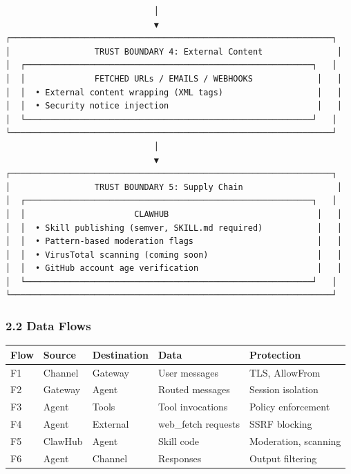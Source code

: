 \begin{lstlisting}
                              │
                              ▼
┌─────────────────────────────────────────────────────────────────┐
│                 TRUST BOUNDARY 4: External Content               │
│  ┌──────────────────────────────────────────────────────────┐   │
│  │              FETCHED URLs / EMAILS / WEBHOOKS             │   │
│  │  • External content wrapping (XML tags)                   │   │
│  │  • Security notice injection                              │   │
│  └──────────────────────────────────────────────────────────┘   │
└─────────────────────────────────────────────────────────────────┘
                              │
                              ▼
┌─────────────────────────────────────────────────────────────────┐
│                 TRUST BOUNDARY 5: Supply Chain                   │
│  ┌──────────────────────────────────────────────────────────┐   │
│  │                      CLAWHUB                              │   │
│  │  • Skill publishing (semver, SKILL.md required)           │   │
│  │  • Pattern-based moderation flags                         │   │
│  │  • VirusTotal scanning (coming soon)                      │   │
│  │  • GitHub account age verification                        │   │
│  └──────────────────────────────────────────────────────────┘   │
└─────────────────────────────────────────────────────────────────┘
\end{lstlisting}


\subsubsection{2.2 Data Flows}



\begin{table}[h]
\centering
\small
\begin{tabular}{|l|l|l|l|l|}
\hline
Flow & Source & Destination & Data & Protection \\
\hline
F1 & Channel & Gateway & User messages & TLS, AllowFrom \\
\hline
F2 & Gateway & Agent & Routed messages & Session isolation \\
\hline
F3 & Agent & Tools & Tool invocations & Policy enforcement \\
\hline
F4 & Agent & External & web\_fetch requests & SSRF blocking \\
\hline
F5 & ClawHub & Agent & Skill code & Moderation, scanning \\
\hline
F6 & Agent & Channel & Responses & Output filtering \\
\hline
\end{tabular}
\end{table}



